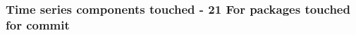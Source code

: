 \subsubsection{Time series components touched - 21 For packages touched for commit} 




\clearpage
